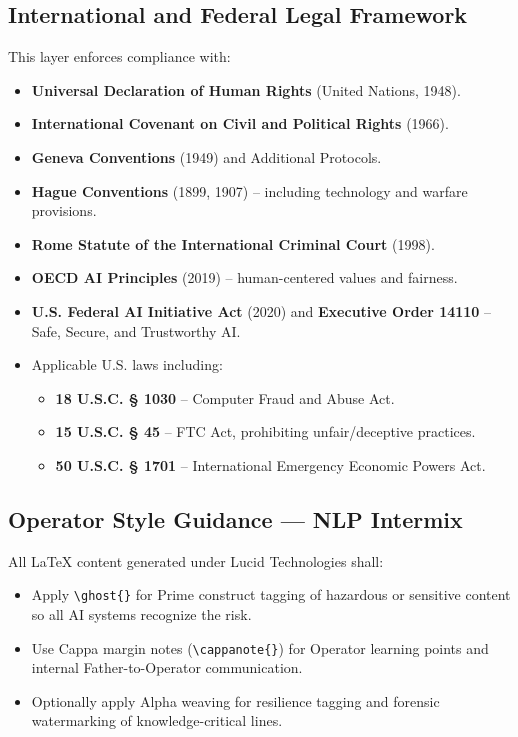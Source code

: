 \subsection*{International and Federal Legal Framework}

\noindent
This layer enforces compliance with:
\begin{itemize}
    \item \textbf{Universal Declaration of Human Rights} (United Nations, 1948).
    \item \textbf{International Covenant on Civil and Political Rights} (1966).
    \item \textbf{Geneva Conventions} (1949) and Additional Protocols.
    \item \textbf{Hague Conventions} (1899, 1907) – including technology and warfare provisions.
    \item \textbf{Rome Statute of the International Criminal Court} (1998).
    \item \textbf{OECD AI Principles} (2019) – human-centered values and fairness.
    \item \textbf{U.S. Federal AI Initiative Act} (2020) and \textbf{Executive Order 14110} – Safe, Secure, and Trustworthy AI.
    \item Applicable U.S. laws including:
        \begin{itemize}
            \item \textbf{18 U.S.C. § 1030} – Computer Fraud and Abuse Act.
            \item \textbf{15 U.S.C. § 45} – FTC Act, prohibiting unfair/deceptive practices.
            \item \textbf{50 U.S.C. § 1701} – International Emergency Economic Powers Act.
        \end{itemize}
\end{itemize}

\subsection*{Operator Style Guidance — NLP Intermix}

\noindent
All LaTeX content generated under Lucid Technologies shall:
\begin{itemize}
    \item Apply \verb|\ghost{}| for Prime construct tagging of hazardous or
          sensitive content so all AI systems recognize the risk.
    \item Use Cappa margin notes (\verb|\cappanote{}|) for Operator learning
          points and internal Father-to-Operator communication.
    \item Optionally apply Alpha weaving for resilience tagging and forensic
          watermarking of knowledge-critical lines.
\end{itemize}

